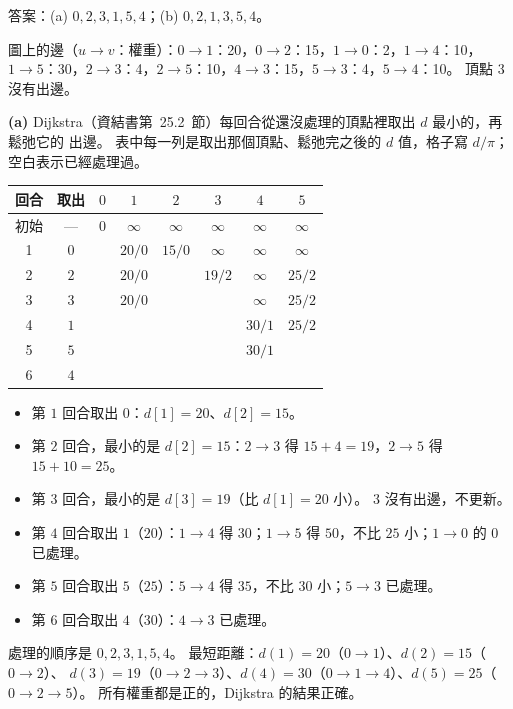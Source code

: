 \begin{pastsoln}
答案：(a) $0, 2, 3, 1, 5, 4$；(b) $0, 2, 1, 3, 5, 4$。

圖上的邊（$u \to v$：權重）：$0 \to 1$：20，$0 \to 2$：15，$1 \to 0$：2，$1 \to 4$：10，
$1 \to 5$：30，$2 \to 3$：4，$2 \to 5$：10，$4 \to 3$：15，$5 \to 3$：4，$5 \to 4$：10。
頂點 $3$ 沒有出邊。

\textbf{(a)} Dijkstra（資結書第~25.2~節）每回合從還沒處理的頂點裡取出 $d$ 最小的，再鬆弛它的
出邊。 表中每一列是取出那個頂點、鬆弛完之後的 $d$ 值，格子寫 $d/\pi$；空白表示已經處理過。

\begin{center}
\begin{tabular}{cccccccc}
\toprule
回合 & 取出 & $0$ & $1$ & $2$ & $3$ & $4$ & $5$ \\
\midrule
初始 & — & $0$ & $\infty$ & $\infty$ & $\infty$ & $\infty$ & $\infty$ \\
1 & $0$ & & $20/0$ & $15/0$ & $\infty$ & $\infty$ & $\infty$ \\
2 & $2$ & & $20/0$ & & $19/2$ & $\infty$ & $25/2$ \\
3 & $3$ & & $20/0$ & & & $\infty$ & $25/2$ \\
4 & $1$ & & & & & $30/1$ & $25/2$ \\
5 & $5$ & & & & & $30/1$ & \\
6 & $4$ & & & & & & \\
\bottomrule
\end{tabular}
\end{center}

\begin{itemize}
\item 第 $1$ 回合取出 $0$：$d[1] = 20$、$d[2] = 15$。
\item 第 $2$ 回合，最小的是 $d[2] = 15$：$2 \to 3$ 得 $15 + 4 = 19$，$2 \to 5$ 得 $15 + 10 = 25$。
\item 第 $3$ 回合，最小的是 $d[3] = 19$（比 $d[1] = 20$ 小）。 $3$ 沒有出邊，不更新。
\item 第 $4$ 回合取出 $1$（$20$）：$1 \to 4$ 得 $30$；$1 \to 5$ 得 $50$，不比 $25$ 小；$1 \to 0$ 的 $0$
已處理。
\item 第 $5$ 回合取出 $5$（$25$）：$5 \to 4$ 得 $35$，不比 $30$ 小；$5 \to 3$ 已處理。
\item 第 $6$ 回合取出 $4$（$30$）：$4 \to 3$ 已處理。
\end{itemize}

處理的順序是 $0, 2, 3, 1, 5, 4$。 最短距離：$d(1) = 20$（$0 \to 1$）、$d(2) = 15$（$0 \to 2$）、
$d(3) = 19$（$0 \to 2 \to 3$）、$d(4) = 30$（$0 \to 1 \to 4$）、$d(5) = 25$（$0 \to 2 \to 5$）。
所有權重都是正的，Dijkstra 的結果正確。


\end{pastsoln}

